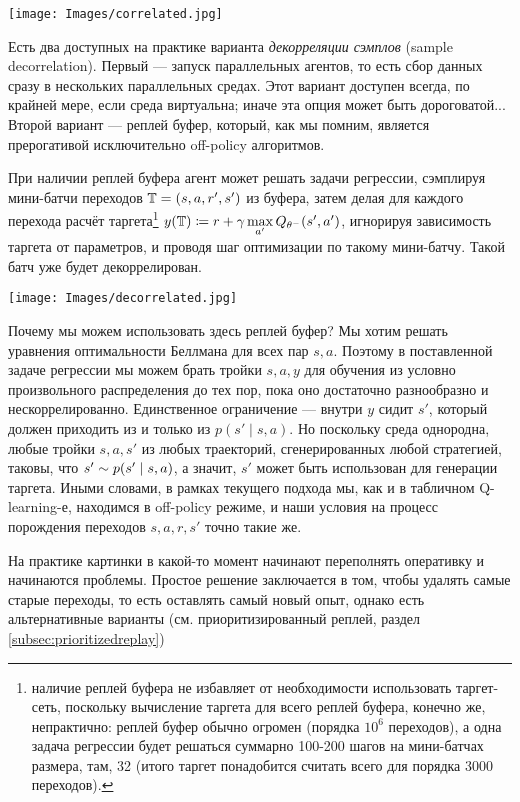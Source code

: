 \begin{center}
    \texttt{[image: Images/correlated.jpg]}
\end{center}

Есть два доступных на практике варианта \emph{декорреляции сэмплов} (sample decorrelation). Первый --- запуск параллельных агентов, то есть сбор данных сразу в нескольких параллельных средах. Этот вариант доступен всегда, по крайней мере, если среда виртуальна; иначе эта опция может быть дороговатой... Второй вариант --- реплей буфер, который, как мы помним, является прерогативой исключительно off-policy алгоритмов.

При наличии реплей буфера агент может решать задачи регрессии, сэмплируя мини-батчи переходов $\T \HM= (s, a, r', s')$ из буфера, затем делая для каждого перехода расчёт таргета\footnote{наличие реплей буфера не избавляет от необходимости использовать таргет-сеть, поскольку вычисление таргета для всего реплей буфера, конечно же, непрактично: реплей буфер обычно огромен (порядка $10^6$ переходов), а одна задача регрессии будет решаться суммарно 100-200 шагов на мини-батчах размера, там, 32 (итого таргет понадобится считать всего для порядка 3000 переходов).} $y(\T) \coloneqq r \HM+ \gamma \max\limits_{a'} Q_{\theta^{-}}(s', a')$, игнорируя зависимость таргета от параметров, и проводя шаг оптимизации по такому мини-батчу. Такой батч уже будет декоррелирован.

\begin{center}
    \texttt{[image: Images/decorrelated.jpg]}
\end{center}

Почему мы можем использовать здесь реплей буфер? Мы хотим решать уравнения оптимальности Беллмана для всех пар $s, a$. Поэтому в поставленной задаче регрессии мы можем брать тройки $s, a, y$ для обучения из условно произвольного распределения до тех пор, пока оно достаточно разнообразно и нескоррелированно. Единственное ограничение --- внутри $y$ сидит $s'$, который должен приходить из и только из $p(s' \mid s, a)$. Но поскольку среда однородна, любые тройки $s, a, s'$ из любых траекторий, сгенерированных любой стратегией, таковы, что $s' \HM\sim p(s' \HM\mid s, a)$, а значит, $s'$ может быть использован для генерации таргета. Иными словами, в рамках текущего подхода мы, как и в табличном Q-learning-е, находимся в off-policy режиме, и наши условия на процесс порождения переходов $s, a, r, s'$ точно такие же.

\begin{remark}
На практике картинки в какой-то момент начинают переполнять оперативку и начинаются проблемы. Простое решение заключается в том, чтобы удалять самые старые переходы, то есть оставлять самый новый опыт, однако есть альтернативные варианты (см. приоритизированный реплей, раздел \ref{subsec:prioritizedreplay})
\end{remark}

